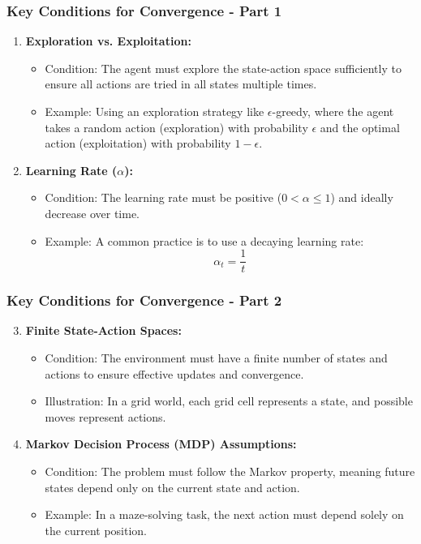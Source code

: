 \documentclass[aspectratio=169]{beamer}
\begin{document}
\begin{frame}[fragile]
    \frametitle{Key Conditions for Convergence - Part 1}
    \begin{enumerate}
        \item \textbf{Exploration vs. Exploitation:}
        \begin{itemize}
            \item Condition: The agent must explore the state-action space sufficiently to ensure all actions are tried in all states multiple times.
            \item Example: Using an exploration strategy like $\epsilon$-greedy, where the agent takes a random action (exploration) with probability $\epsilon$ and the optimal action (exploitation) with probability $1 - \epsilon$.
        \end{itemize}

        \item \textbf{Learning Rate ($\alpha$):}
        \begin{itemize}
            \item Condition: The learning rate must be positive ($0 < \alpha \leq 1$) and ideally decrease over time.
            \item Example: A common practice is to use a decaying learning rate:
            \begin{equation}
                \alpha_t = \frac{1}{t}
            \end{equation}
        \end{itemize}
    \end{enumerate}
\end{frame}

\begin{frame}[fragile]
    \frametitle{Key Conditions for Convergence - Part 2}
    \begin{enumerate}
        \setcounter{enumi}{2}
        \item \textbf{Finite State-Action Spaces:}
        \begin{itemize}
            \item Condition: The environment must have a finite number of states and actions to ensure effective updates and convergence.
            \item Illustration: In a grid world, each grid cell represents a state, and possible moves represent actions.
        \end{itemize}

        \item \textbf{Markov Decision Process (MDP) Assumptions:}
        \begin{itemize}
            \item Condition: The problem must follow the Markov property, meaning future states depend only on the current state and action.
            \item Example: In a maze-solving task, the next action must depend solely on the current position.
        \end{itemize}
    \end{enumerate}
\end{frame}
\end{document}
